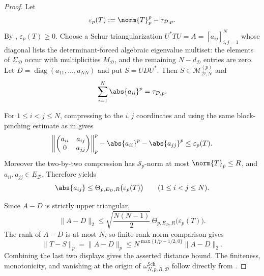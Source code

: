 \begin{proof}
  Let
  \[
    \varepsilon_p(T):=\norm{T}_p^p-\tau_{\mathcal D,p}.
  \]
  By ,
  \(\varepsilon_p(T)\ge0\). Choose a Schur triangularization
  \(U^*TU=A=[a_{ij}]_{i,j=1}^N\) whose diagonal lists the determinant-forced
  algebraic eigenvalue multiset: the elements of \(\Sigma_{\mathcal D}\)
  occur with multiplicities \(M_{\mathcal D}\), and the remaining
  \(N-d_{\mathcal D}\) entries are zero. Let
  \(D=\operatorname{diag}(a_{11},\ldots,a_{NN})\) and put \(S=UDU^*\). Then
  \(S\in\mathcal M_{\mathcal D,N}^{(p)}\) and
  \[
    \sum_{i=1}^N\abs{a_{ii}}^p=\tau_{\mathcal D,p}.
  \]

  For \(1\le i<j\le N\), compressing to the \(i,j\) coordinates and using
  the same block-pinching estimate as in
   gives
  \[
    \left\|
      \begin{pmatrix}a_{ii}&a_{ij}\\0&a_{jj}\end{pmatrix}
    \right\|_p^p-
    \abs{a_{ii}}^p-\abs{a_{jj}}^p
    \le \varepsilon_p(T).
  \]
  Moreover the two-by-two compression has \(\mathcal S_p\)-norm at most
  \(\norm{T}_p\le R\), and \(a_{ii},a_{jj}\in E_{\mathcal D}\). Therefore
   yields
  \[
    \abs{a_{ij}}
    \le
    \Theta_{p,E_{\mathcal D},R}\bigl(\varepsilon_p(T)\bigr)
    \qquad(1\le i<j\le N).
  \]

  Since \(A-D\) is strictly upper triangular,
  \[
    \|A-D\|_2
    \le
    \sqrt{\frac{N(N-1)}{2}}\,
    \Theta_{p,E_{\mathcal D},R}\bigl(\varepsilon_p(T)\bigr).
  \]
  The rank of \(A-D\) is at most \(N\), so finite-rank norm comparison gives
  \[
    \|T-S\|_p
    =\|A-D\|_p
    \le
    N^{\max\{1/p-1/2,0\}}\|A-D\|_2 .
  \]
  Combining the last two displays gives the asserted distance bound. The
  finiteness, monotonicity, and vanishing at the origin of
  \(\omega_{N,p,R,\mathcal D}^{\mathrm{Sch}}\) follow directly from
  .
\end{proof}

